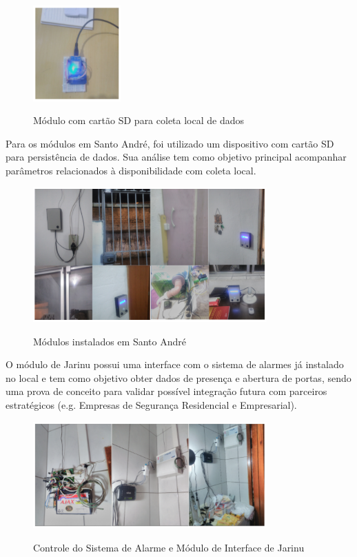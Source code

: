 \begin{figure}[H]
	\centering
	\caption{Módulo com cartão SD para coleta local de dados}
	\includegraphics[width=0.3\textwidth]{SDColetaDados}
	\label{fig:SDColetaDados}
\end{figure}

Para os módulos em Santo André, foi utilizado um dispositivo com cartão SD para persistência de dados. Sua análise tem como objetivo principal acompanhar parâmetros relacionados à disponibilidade com coleta local.

\begin{figure}[H]
	\centering
	\caption{Módulos instalados em Santo André}
	\includegraphics[width=0.8\textwidth]{ModulosStoAndre}
	\label{fig:ModulosStoAndre}
\end{figure}

O módulo de Jarinu possui uma interface com o sistema de alarmes já instalado no local e tem como objetivo obter dados de presença e abertura de portas, sendo uma prova de conceito para validar possível integração futura com parceiros estratégicos (e.g. Empresas de Segurança Residencial e Empresarial).

\begin{figure}[H]
	\centering
	\caption{Controle do Sistema de Alarme e Módulo de Interface de Jarinu}
	\includegraphics[width=0.8\textwidth]{ModuloSistAlarme}
	\label{fig:ModuloSistAlarme}
\end{figure}

